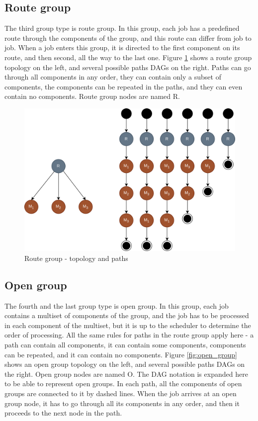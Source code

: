 \subsection{Route group}

The third group type is route group. In this group, each job has a predefined route through the components of the group, and this route can differ from job to job. When a job enters this group, it is directed to the first component on its route, and then second, all the way to the last one. Figure \ref{fig:route_group} shows a route group topology on the left, and several possible paths DAGs on the right. Paths can go through all components in any order, they can contain only a subset of components, the components can be repeated in the paths, and they can even contain no components. Route group nodes are named R.

\begin{figure}[!htbp]
	\centering
	\includegraphics[scale=0.3]{../images/route_group.png}
	\caption{Route group - topology and paths}
    \label{fig:route_group}
\end{figure}

\subsection{Open group}

The fourth and the last group type is open group. In this group, each job contains a multiset of components of the group, and the job has to be processed in each component of the multiset, but it is up to the scheduler to determine the order of processing. All the same rules for paths in the route group apply here - a path can contain all components, it can contain some components, components can be repeated, and it can contain no components. Figure \ref{fig:open_group} shows an open group topology on the left, and several possible paths DAGs on the right. Open group nodes are named O. The DAG notation is expanded here to be able to represent open groups. In each path, all the components of open groups are connected to it by dashed lines. When the job arrives at an open group node, it has to go through all its components in any order, and then it proceeds to the next node in the path.

